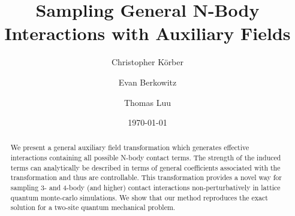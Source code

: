 \documentclass[aps,prl,twocolumn,showpacs,superscriptaddress,groupedaddress, final, nofootinbib]{revtex4}  %
\begin{document}
\title{Sampling General N-Body Interactions with Auxiliary Fields}
\author{Christopher K\"orber}
\author{Evan Berkowitz}
\author{Thomas Luu}
\date{\today}


\begin{abstract}
We present a general auxiliary field transformation which generates effective interactions containing all possible N-body contact terms.
The strength of the induced terms can analytically be described in terms of general coefficients associated with the transformation and thus are controllable.
This transformation provides a novel way for sampling 3- and 4-body (and higher) contact interactions non-perturbatively in lattice quantum monte-carlo simulations.
We show that our method reproduces the exact solution for a two-site quantum mechanical problem.
\end{abstract}

\maketitle
\end{document}
